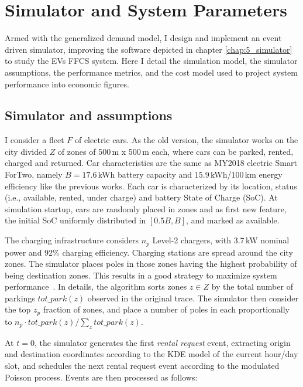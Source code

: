 \section{Simulator and System Parameters}
\label{sec:10_4_ModelSimulation}

Armed with the generalized demand model, I design and implement an event driven simulator, improving the software depicted in chapter \ref{chap:5_simulator} to study the EVs FFCS system. Here I detail the simulation model, the simulator assumptions, the performance metrics, and the cost model used to project system performance into economic figures.

\subsection{Simulator and assumptions}

I consider a fleet $F$ of electric cars. As the old version, the simulator works on the city divided $Z$ of zones of 500\,m x 500\,m each, where cars can be parked, rented, charged and returned. Car characteristics are the same as MY2018 electric Smart ForTwo, namely $B=17.6$\,kWh battery capacity and $15.9$\,kWh/$100$\,km energy efficiency like the previous works. Each car is characterized by its location, status (i.e., available, rented, under charge) and battery State of Charge (SoC). 
At simulation startup, cars are randomly placed in zones and as first new feature, the initial SoC uniformly distributed in $[0.5 B , B]$, and marked as available.

The charging infrastructure considers $n_p$ Level-2 chargers, with 3.7\,kW nominal power and 92\% charging efficiency. Charging stations are spread around the city zones. The simulator places poles in those zones having the highest probability of being destination zones. This results in a good strategy to maximize system performance~\cite{7_cocca2019free,8_cocca2019free}. In details, the algorithm sorts zones $z\in Z$ by the total number of parkings $tot\_park(z)$ observed in the original trace. The simulator then consider the top $z_{p}$ fraction of zones, and place a number of poles in each proportionally to
$
{n_p \cdot tot\_park(z)/\sum_z tot\_park(z)}
$.


At $t=0$, the simulator generates the first \emph{rental request} event, extracting origin and destination coordinates according to the KDE model of the current hour/day slot, and schedules the next rental request event according to the modulated Poisson process. Events are then processed as follows:



